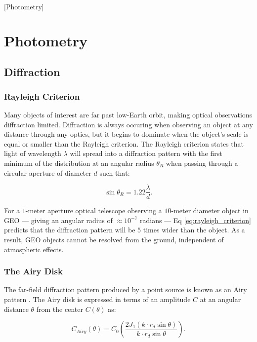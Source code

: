 [Photometry]
\graphicspath{{/Users/liamrobinson/Documents/PyLightCurves/docs/build/html/_images}}

\section{Photometry}

\subsection{Diffraction}

\subsubsection{Rayleigh Criterion}

Many objects of interest are far past low-Earth orbit, making optical observations diffraction limited. Diffraction is always occuring when observing an object at any distance through any optics, but it begins to dominate when the object's scale is equal or smaller than the Rayleigh criterion. The Rayleigh criterion states that light of wavelength $\lambda$ will spread into a diffraction pattern with the first minimum of the distribution at an angular radius $\theta_R$ when passing through a circular aperture of diameter $d$ such that:

\begin{equation} \label{eq:rayleigh_criterion}
  \sin\theta_R = 1.22 \frac{\lambda}{d}.
\end{equation}

For a $1$-meter aperture optical telescope observing a $10$-meter diameter object in GEO --- giving an angular radius of $\approx 10^{-7}$ radians --- Eq \ref{eq:rayleigh_criterion} predicts that the diffraction pattern will be $5$ times wider than the object. As a result, GEO objects cannot be resolved from the ground, independent of atmospheric effects. 

\subsubsection{The Airy Disk}

The far-field diffraction pattern produced by a point source is known as an Airy pattern \cite{frueh2019notes}. The Airy disk is expressed in terms of an amplitude $C$ at an angular distance $\theta$ from the center $C(\theta)$ as:

\begin{equation} \label{eq:airy_disk}
  C_{Airy}(\theta) = C_0 \left( \frac{2 J_1(k \cdot r_d \sin\theta)}{k \cdot r_d \sin\theta} \right).
\end{equation}

